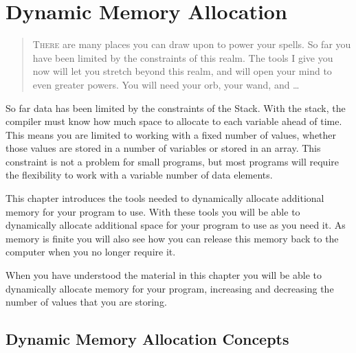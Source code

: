 
\chapter{Dynamic Memory Allocation} %
\label{cha:dynamic_memory_allocation}

\begin{quote}
  \Fontlukas\Large
  \renewcommand{\LettrineTextFont}{\relax}
  \lettrine[image=true,lines=3,lraise=0.1]
  {T}{here} are many places you can draw upon to power your spells. So far you have been limited by the constraints of this realm. The tools I give you now will let you stretch beyond this realm, and will open your mind to even greater powers. You will need your orb, your wand, and \ldots
\end{quote}

\bigskip

So far data has been limited by the constraints of the Stack. With the stack, the compiler must know how much space to allocate to each variable ahead of time. This means you are limited to working with a fixed number of values, whether those values are stored in a number of variables or stored in an array. This constraint is not a problem for small programs, but most programs will require the flexibility to work with a variable number of data elements.

This chapter introduces the tools needed to dynamically allocate additional memory for your program to use. With these tools you will be able to dynamically allocate additional space for your program to use as you need it. As memory is finite you will also see how you can release this memory back to the computer when you no longer require it.

When you have understood the material in this chapter you will be able to dynamically allocate memory for your program, increasing and decreasing the number of values that you are storing.

\minitoc


\clearpage
\section{Dynamic Memory Allocation Concepts} %
\label{sec:dynamic_memory_allocation_concepts}









